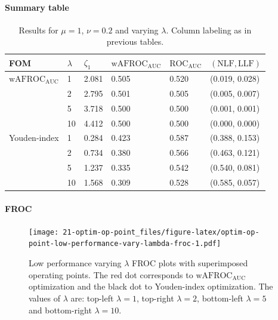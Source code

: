 \documentclass[
]{book}
\begin{document}
\hypertarget{summary-table-7}{%
\paragraph{Summary table}\label{summary-table-7}}

\begin{table}

\caption{\label{tab:optim-op-point-low-performance-vary-lambda-table}Results for $\mu = 1$, $\nu = 0.2$ and varying $\lambda$. Column labeling as in previous tables.}
\centering
\fontsize{10}{12}\selectfont
\begin{tabular}[t]{llllll}
\toprule
FOM & $\lambda$ & $\zeta_1$ & $\text{wAFROC}_\text{AUC}$ & $\text{ROC}_\text{AUC}$ & $\left( \text{NLF}, \text{LLF}\right)$\\
\midrule
$\text{wAFROC}_\text{AUC}$ & 1 & 2.081 & 0.505 & 0.520 & (0.019, 0.028)\\
 & 2 & 2.795 & 0.501 & 0.505 & (0.005, 0.007)\\
 & 5 & 3.718 & 0.500 & 0.500 & (0.001, 0.001)\\
 & 10 & 4.412 & 0.500 & 0.500 & (0.000, 0.000)\\
Youden-index & 1 & 0.284 & 0.423 & 0.587 & (0.388, 0.153)\\
\addlinespace
 & 2 & 0.734 & 0.380 & 0.566 & (0.463, 0.121)\\
 & 5 & 1.237 & 0.335 & 0.542 & (0.540, 0.081)\\
 & 10 & 1.568 & 0.309 & 0.528 & (0.585, 0.057)\\
\bottomrule
\end{tabular}
\end{table}

\hypertarget{froc-8}{%
\paragraph{FROC}\label{froc-8}}

\begin{figure}
\centering
\texttt{[image: 21-optim-op-point\_files/figure-latex/optim-op-point-low-performance-vary-lambda-froc-1.pdf]}
\caption{\label{fig:optim-op-point-low-performance-vary-lambda-froc}Low performance varying \(\lambda\) FROC plots with superimposed operating points. The red dot corresponds to \(\text{wAFROC}_\text{AUC}\) optimization and the black dot to Youden-index optimization. The values of \(\lambda\) are: top-left \(\lambda = 1\), top-right \(\lambda = 2\), bottom-left \(\lambda = 5\) and bottom-right \(\lambda = 10\).}
\end{figure}
\end{document}
